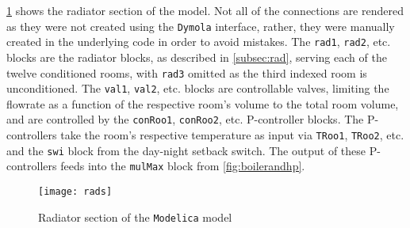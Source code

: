 \cref{fig:radssec} shows the radiator section of the model. Not all of the connections are rendered as they were not created using the \texttt{Dymola} interface, rather, they were manually created in the underlying code in order to avoid mistakes. The \texttt{rad1}, \texttt{rad2}, etc. blocks are the radiator blocks, as described in \cref{subsec:rad}, serving each of the twelve conditioned rooms, with \texttt{rad3} omitted as the third indexed room is unconditioned. The \texttt{val1}, \texttt{val2}, etc. blocks are controllable valves, limiting the flowrate as a function of the respective room's volume to the total room volume, and are controlled by the \texttt{conRoo1}, \texttt{conRoo2}, etc. P-controller blocks. The P-controllers take the room's respective temperature as input via \texttt{TRoo1}, \texttt{TRoo2}, etc. and the \texttt{swi} block from the day-night setback switch. The output of these P-controllers feeds into the \texttt{mulMax} block from \cref{fig:boilerandhp}.
\begin{figure}[htb]
    \centering
    \texttt{[image: rads]}
    \caption{Radiator section of the \texttt{Modelica} model}
    \label{fig:radssec}
\end{figure}